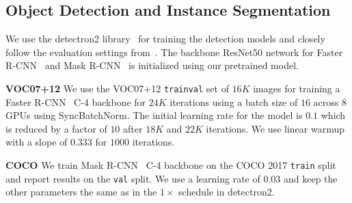 \subsection{Object Detection and Instance Segmentation}
We use the detectron2 library~\cite{wu2019detectron2} for training the detection models and closely follow the evaluation settings from~\cite{he2019momentum}. The backbone ResNet50 network for Faster R-CNN~\cite{ren2015faster} and Mask R-CNN~\cite{he2017mask} is initialized using our \AlgoName{} pretrained model.

\par \noindent \textbf{VOC07+12} We use the VOC07+12 \texttt{trainval} set of $16K$ images for training a Faster R-CNN~\cite{ren2015faster} C-4 backbone for $24K$ iterations using a batch size of $16$ across $8$ GPUs using SyncBatchNorm. The initial learning rate for the model is $0.1$ which is reduced by a factor of $10$ after $18K$ and $22K$ iterations. We use linear warmup~\cite{goyal2017accurate} with a slope of $0.333$ for $1000$ iterations.
\par \noindent \textbf{COCO} We train Mask R-CNN~\cite{he2017mask} C-4 backbone on the COCO 2017 \texttt{train} split and report results on the \texttt{val} split. We use a learning rate of $0.03$ and keep the other parameters the same as in the $1\times$ schedule in detectron2.



